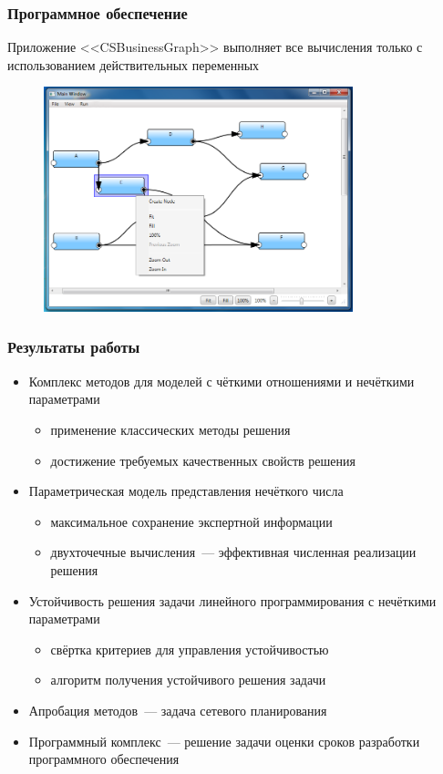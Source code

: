 \documentclass[12pt]{beamer}
\begin{document}
\begin{frame}
  \frametitle{Программное обеспечение}
  Приложение <<CSBusinessGraph>> выполняет все вычисления только с использованием действительных переменных
  \begin{figure}
    \center
    \includegraphics[width=0.8\textwidth]{app-sample-graph.png}
  \end{figure}
\end{frame}


\begin{frame}
  \frametitle{Результаты работы}
  \begin{itemize}
    \item Комплекс методов для моделей с чёткими отношениями и нечёткими параметрами
    \begin{itemize}
      \item применение классических методы решения
      \item достижение требуемых качественных свойств решения
    \end{itemize}
    \item Параметрическая модель представления нечёткого числа
    \begin{itemize}
      \item максимальное сохранение экспертной информации
      \item двухточечные вычисления~--- эффективная численная реализации решения
    \end{itemize}
    \item Устойчивость решения задачи линейного программирования с нечёткими параметрами
    \begin{itemize}
      \item свёртка критериев для управления устойчивостью
      \item алгоритм получения устойчивого решения задачи
    \end{itemize}
    \item Апробация методов~--- задача сетевого планирования
    \item Программный комплекс~--- решение задачи оценки сроков разработки программного обеспечения
  \end{itemize}
\end{frame}
\end{document}
